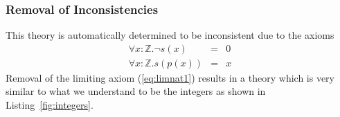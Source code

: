 \subsubsection{Removal of Inconsistencies}
This theory is automatically determined to be inconsistent due to the axioms
\begin{eqnarray}
\forall x : \mathbb{Z} . \neg s(x) &=& 0 \label{eq:limnat1}\\
\forall x : \mathbb{Z} . s(p(x)) &=& x \label{eq:sucpre}
\end{eqnarray}
Removal of the limiting axiom (\ref{eq:limnat1}) results in a theory which is very
similar to what we understand to be the integers as shown in Listing~\ref{fig:integers}.
\begin{listing}[!ht]
\begin{mdframed}

\end{mdframed}
\end{listing}
